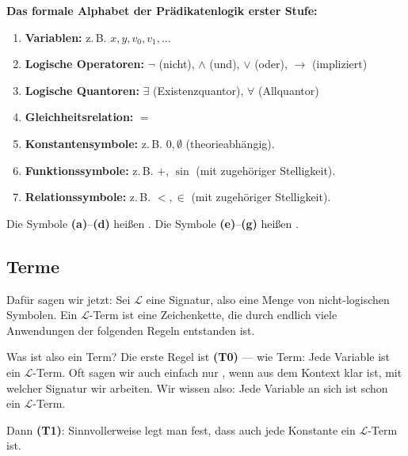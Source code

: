 \begin{math-stroke}
\textbf{Das formale Alphabet der Prädikatenlogik erster Stufe:}
\begin{enumerate}[label=\textbf{(\alph*)}]
    \item \textbf{Variablen:} z.\,B. $x, y, v_0, v_1, \dots$
    \item \textbf{Logische Operatoren:} $\neg$ (nicht), $\wedge$ (und), $\vee$ (oder), $\rightarrow$ (impliziert)
    \item \textbf{Logische Quantoren:} $\exists$ (Existenzquantor), $\forall$ (Allquantor)
    \item \textbf{Gleichheitsrelation:} $=$
    \item \textbf{Konstantensymbole:} z.\,B. $0, \emptyset$ (theorieabhängig).
    \item \textbf{Funktionssymbole:} z.\,B. $+$, $\sin$ (mit zugehöriger Stelligkeit).
    \item \textbf{Relationssymbole:} z.\,B. $<, \in$ (mit zugehöriger Stelligkeit).
\end{enumerate}

Die Symbole \textbf{(a)}--\textbf{(d)} heißen .
Die Symbole \textbf{(e)}--\textbf{(g)} heißen .

\end{math-stroke}

\subsection{Terme}

\begin{spoken-clean}[00:41:45 - 00:43:25]
Dafür sagen wir jetzt: Sei $\mathcal{L}$ eine Signatur, also eine Menge von nicht-logischen Symbolen. Ein $\mathcal{L}$-Term ist eine Zeichenkette, die durch endlich viele Anwendungen der folgenden Regeln entstanden ist. 

Was ist also ein Term? Die erste Regel ist \textbf{(T0)} ---  wie Term: Jede Variable ist ein $\mathcal{L}$-Term. Oft sagen wir auch einfach nur , wenn aus dem Kontext klar ist, mit welcher Signatur wir arbeiten. Wir wissen also: Jede Variable an sich ist schon ein $\mathcal{L}$-Term. 

Dann \textbf{(T1)}: Sinnvollerweise legt man fest, dass auch jede Konstante ein $\mathcal{L}$-Term ist.
\end{spoken-clean}

